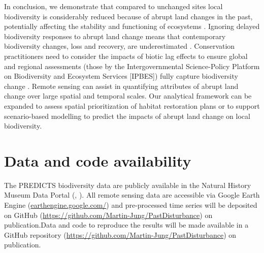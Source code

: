 In conclusion, we demonstrate that compared to unchanged sites local biodiversity is considerably reduced because of abrupt land changes in the past, potentially affecting the stability and functioning of ecosystems \citep{Hautier2015}. Ignoring delayed biodiversity responses to abrupt land change means that contemporary biodiversity changes, loss and recovery, are underestimated \citep{Kuussaari2009,Essl2015}. Conservation practitioners need to consider the impacts of biotic lag effects to ensure global and regional assessments (\eg those by the Intergovernmental Science-Policy Platform on Biodiversity and Ecosystem Services [IPBES]) fully capture biodiversity change \citep{Essl2015}. Remote sensing can assist in quantifying attributes of abrupt land change over large spatial and temporal scales. Our analytical framework can be expanded to assess spatial prioritization of habitat restoration plans or to support scenario-based modelling \citep{Ewers2009} to predict the impacts of abrupt land change on local biodiversity.

\section{Data and code availability}
\label{C03_05}
The PREDICTS biodiversity data are publicly available in the Natural History Museum Data Portal (, \cite{Hudson2016}). All remote sensing data are accessible via Google Earth Engine (\href{earthengine.google.com/}{earthengine.google.com/}) \citep{Gorelick2017} and pre-processed time series will be deposited on GitHub (\href{https://github.com/Martin-Jung/PastDisturbance}{https://github.com/Martin-Jung/PastDisturbance}) on publication.Data and code to reproduce the results will be made available in a GitHub repository (\href{https://github.com/Martin-Jung/PastDisturbance}{https://github.com/Martin-Jung/PastDisturbance}) on publication.

\clearpage
%

%  
